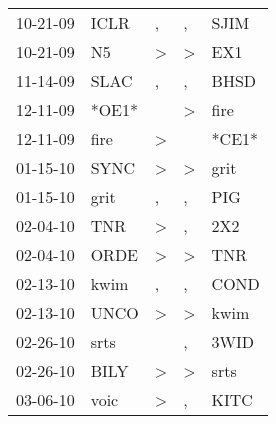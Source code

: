 \begin{supertabular}{p{0.07\textwidth}p{0.06\textwidth}p{0.02\textwidth}p{0.02\textwidth}p{0.06\textwidth}}
          10-21-09\textsuperscript{} &           ICLR\textsuperscript{} &                , &                , &           SJIM\textsuperscript{} \\
          10-21-09\textsuperscript{} &             N5\textsuperscript{} &     \textgreater &     \textgreater &            EX1\textsuperscript{} \\
          11-14-09\textsuperscript{} &           SLAC\textsuperscript{} &                , &                , &           BHSD\textsuperscript{} \\
          12-11-09\textsuperscript{} &                            *OE1* &                  &     \textgreater &           fire\textsuperscript{} \\
          12-11-09\textsuperscript{} &           fire\textsuperscript{} &     \textgreater &                  &                            *CE1* \\
          01-15-10\textsuperscript{} &           SYNC\textsuperscript{} &     \textgreater &     \textgreater &           grit\textsuperscript{} \\
          01-15-10\textsuperscript{} &           grit\textsuperscript{} &                , &                , &            PIG\textsuperscript{} \\
          02-04-10\textsuperscript{} &            TNR\textsuperscript{} &     \textgreater &                , &            2X2\textsuperscript{} \\
          02-04-10\textsuperscript{} &           ORDE\textsuperscript{} &     \textgreater &     \textgreater &            TNR\textsuperscript{} \\
          02-13-10\textsuperscript{} &           kwim\textsuperscript{} &                , &                , &           COND\textsuperscript{} \\
          02-13-10\textsuperscript{} &           UNCO\textsuperscript{} &     \textgreater &     \textgreater &           kwim\textsuperscript{} \\
          02-26-10\textsuperscript{} &           srts\textsuperscript{} &                  &                , &           3WID\textsuperscript{} \\
          02-26-10\textsuperscript{} &           BILY\textsuperscript{} &     \textgreater &     \textgreater &           srts\textsuperscript{} \\
          03-06-10\textsuperscript{} &           voic\textsuperscript{} &     \textgreater &                , &           KITC\textsuperscript{} \\

\end{supertabular}
